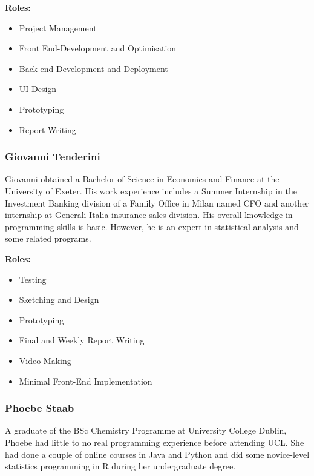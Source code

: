 \textbf{Roles:}

\begin{itemize}
\tightlist
\item
  Project Management
\item
  Front End-Development and Optimisation
\item
  Back-end Development and Deployment
\item
  UI Design
\item
  Prototyping
\item
  Report Writing
\end{itemize}

\hypertarget{giovanni-tenderini}{%
\subsubsection{Giovanni Tenderini}\label{giovanni-tenderini}}

Giovanni obtained a Bachelor of Science in Economics and Finance at the
University of Exeter. His work experience includes a Summer Internship
in the Investment Banking division of a Family Office in Milan named CFO
and another internship at Generali Italia insurance sales division. His
overall knowledge in programming skills is basic. However, he is an
expert in statistical analysis and some related programs.

\textbf{Roles:}

\begin{itemize}
\tightlist
\item
  Testing
\item
  Sketching and Design
\item
  Prototyping
\item
  Final and Weekly Report Writing
\item
  Video Making
\item
  Minimal Front-End Implementation
\end{itemize}

\hypertarget{phoebe-staab}{%
\subsubsection{Phoebe Staab}\label{phoebe-staab}}

A graduate of the BSc Chemistry Programme at University College Dublin,
Phoebe had little to no real programming experience before attending
UCL. She had done a couple of online courses in Java and Python and did
some novice-level statistics programming in R during her undergraduate
degree.

